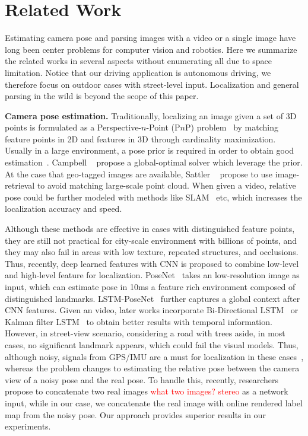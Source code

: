 \section{Related Work}
\label{sec:related_work}
Estimating camera pose and parsing images with a video or a single image have long been center problems for computer vision and robotics.
Here we summarize the related works in several aspects without enumerating all due to space limitation.
Notice that our driving application is autonomous driving,  we therefore focus on outdoor cases with street-level input. Localization and general parsing in the wild is beyond the scope of this paper.

\textbf{Camera pose estimation.} Traditionally, localizing an image given a set of 3D points is formulated as a Perspective-$n$-Point (P$n$P) problem~\cite{haralick1994review,kneip2014upnp} by matching feature points in 2D and features in 3D through cardinality maximization. Usually in a large environment, a pose prior is required in order to obtain good estimation~\cite{david2004softposit,moreno2008pose}. Campbell \etal~\cite{campbell2017globally} propose a global-optimal solver which leverage the prior. At the case that geo-tagged images are available, Sattler \etal~\cite{sattler2017large} propose to use image-retrieval to avoid matching large-scale point cloud.
When given a video, relative pose could be further modeled with methods like SLAM~\cite{engel2014lsd} etc, which increases the localization accuracy and speed.

Although these methods are effective in cases with distinguished feature points, they are still not practical for city-scale environment with billions of points, and they may also fail in areas with low texture, repeated structures, and occlusions.
Thus, recently, deep learned features with CNN is proposed to combine low-level and high-level feature for localization. PoseNet~\cite{Kendall_2015_ICCV,kendall2017geometric} takes an low-resolution image as input, which can estimate pose in 10ms \wrt a feature rich environment composed of distinguished landmarks. LSTM-PoseNet~\cite{hazirbasimage} further captures a global context after CNN features.
Given an video, later works incorporate Bi-Directional LSTM~\cite{DBLP:journals/corr/ClarkWMTW17} or Kalman filter LSTM~\cite{coskun2017long} to obtain better results with temporal information. However, in street-view scenario, considering a road with trees aside, in most cases, no significant landmark appears, which could fail the visual models. Thus, although noisy, signals from GPS/IMU are a must for localization in these cases~\cite{vishal2015accurate}, whereas the problem changes to estimating the relative pose between the camera view of a noisy pose and the real pose. To handle this, recently, researchers ~\cite{laskar2017camera,ummenhofer2016demon} propose to concatenate two real images \textcolor{red}{what two images? stereo} as a network input, while in our case, we concatenate the real image with online rendered label map from the noisy pose. Our approach provides superior results in our experiments.

